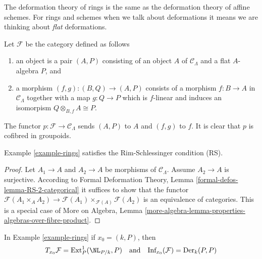 \noindent
The deformation theory of rings is the same as the deformation theory
of affine schemes. For rings and schemes when we talk about deformations
it means we are thinking about {\it flat} deformations.

\begin{example}[Rings]
\label{example-rings}
Let $\mathcal{F}$ be the category defined as follows
\begin{enumerate}
\item an object is a pair $(A, P)$ consisting of an
object $A$ of $\mathcal{C}_\Lambda$ and a flat $A$-algebra $P$, and
\item a morphism $(f, g) : (B, Q) \to (A, P)$ consists of
a morphism $f : B \to A$ in $\mathcal{C}_\Lambda$ together
with a map $g : Q \to P$ which is $f$-linear and induces an
isomorpism $Q \otimes_{B, f} A \cong P$.
\end{enumerate}
The functor $p : \mathcal{F} \to \mathcal{C}_\Lambda$ sends $(A, P)$
to $A$ and $(f, g)$ to $f$. It is clear that $p$ is cofibred in groupoids.
\end{example}

\begin{lemma}
\label{lemma-rings-RS}
Example \ref{example-rings}
satisfies the Rim-Schlessinger condition (RS).
\end{lemma}

\begin{proof}
Let $A_1 \to A$ and $A_2 \to A$ be morphisms of $\mathcal{C}_\Lambda$.
Assume $A_2 \to A$ is surjective. According to
Formal Deformation Theory, Lemma
\ref{formal-defos-lemma-RS-2-categorical}
it suffices to show that the functor
$\mathcal{F}(A_1 \times_A A_2) \to
\mathcal{F}(A_1) \times_{\mathcal{F}(A)} \mathcal{F}(A_2)$
is an equivalence of categories.
This is a special case of More on Algebra, Lemma
\ref{more-algebra-lemma-properties-algebras-over-fibre-product}.
\end{proof}

\begin{lemma}
\label{lemma-rings-TI}
In Example \ref{example-rings} if $x_0 = (k, P)$, then
$$
T_{x_0}\mathcal{F} = \text{Ext}^1_P(\NL_{P/k}, P)
\quad\text{and}\quad
\text{Inf}_{x_0}(\mathcal{F}) = \text{Der}_k(P, P)
$$
\end{lemma}

